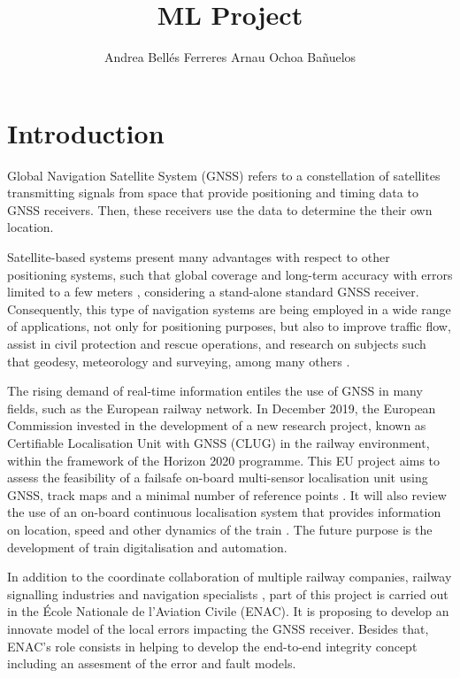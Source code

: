 \documentclass[a4paper, report, oneside, UKenglish]{memoir}
\title{ML Project}
\author{Andrea Bellés Ferreres \newline Arnau Ochoa Bañuelos}
\begin{document}
\projectfrontpage

\newpage
\begin{abstract}
\noindent

\end{abstract}

\newpage
\begin{KeepFromToc}
    \tableofcontents
\end{KeepFromToc}

\newpage
\chapter{Introduction}\label{ch:intro}
Global Navigation Satellite System (GNSS) refers to a constellation of satellites transmitting signals from space that provide positioning and timing data to GNSS receivers. Then, these receivers use the data to determine the their own location.

Satellite-based systems present many advantages with respect to other positioning systems, such that global coverage and long-term accuracy with errors limited to a few meters \cite{groves}, considering a stand-alone standard GNSS receiver. Consequently, this type of navigation systems are being employed in a wide range of applications, not only for positioning purposes, but also to improve traffic flow, assist in civil protection and rescue operations, and research on subjects such that geodesy, meteorology and surveying, among many others \cite{EGSAwebsite}. 

The rising demand of real-time information entiles the use of GNSS in many fields, such as the European railway network. In December 2019, the European Commission invested in the development of a new research project, known as Certifiable Localisation Unit with GNSS  (CLUG) in the railway environment, within the framework of the Horizon 2020 programme. This EU project aims to assess the feasibility of a failsafe on-board multi-sensor localisation unit using GNSS, track maps and a minimal number of reference points \cite{CORDISwebsite}. It will also review the use of an on-board continuous localisation system that provides information on location, speed and other dynamics of the train \cite{CORDISwebsite}. The future purpose is the development of train digitalisation and automation. 

In addition to the coordinate collaboration of multiple railway companies, railway signalling industries and navigation specialists \cite{CORDISwebsite}, part of this project is carried out in the École Nationale de l'Aviation Civile (ENAC). It is proposing to develop an innovate model of the local errors impacting the GNSS receiver. Besides that, ENAC's role consists in helping to develop the end-to-end integrity concept including an assesment of the error and fault models.  
\end{document}
